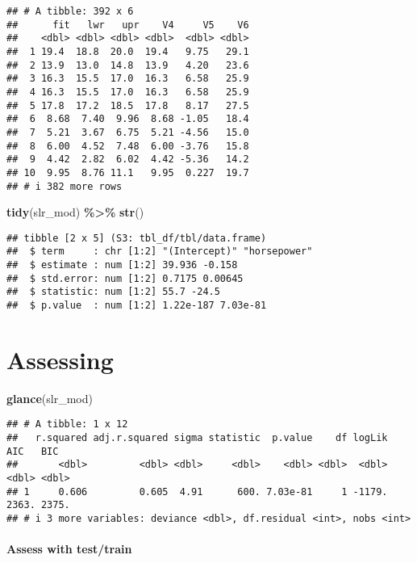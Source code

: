 \documentclass[
]{article}
\newenvironment{Shaded}{\begin{snugshade}}{\end{snugshade}}
\newcommand{\FunctionTok}[1]{\textcolor[rgb]{0.13,0.29,0.53}{\textbf{#1}}}
\newcommand{\NormalTok}[1]{#1}
\newcommand{\SpecialCharTok}[1]{\textcolor[rgb]{0.81,0.36,0.00}{\textbf{#1}}}
\begin{document}
\begin{verbatim}
## # A tibble: 392 x 6
##      fit   lwr   upr    V4     V5    V6
##    <dbl> <dbl> <dbl> <dbl>  <dbl> <dbl>
##  1 19.4  18.8  20.0  19.4   9.75   29.1
##  2 13.9  13.0  14.8  13.9   4.20   23.6
##  3 16.3  15.5  17.0  16.3   6.58   25.9
##  4 16.3  15.5  17.0  16.3   6.58   25.9
##  5 17.8  17.2  18.5  17.8   8.17   27.5
##  6  8.68  7.40  9.96  8.68 -1.05   18.4
##  7  5.21  3.67  6.75  5.21 -4.56   15.0
##  8  6.00  4.52  7.48  6.00 -3.76   15.8
##  9  4.42  2.82  6.02  4.42 -5.36   14.2
## 10  9.95  8.76 11.1   9.95  0.227  19.7
## # i 382 more rows
\end{verbatim}

\begin{Shaded}
\begin{Highlighting}[]
\FunctionTok{tidy}\NormalTok{(slr\_mod) }\SpecialCharTok{\%\textgreater{}\%} \FunctionTok{str}\NormalTok{()}
\end{Highlighting}
\end{Shaded}

\begin{verbatim}
## tibble [2 x 5] (S3: tbl_df/tbl/data.frame)
##  $ term     : chr [1:2] "(Intercept)" "horsepower"
##  $ estimate : num [1:2] 39.936 -0.158
##  $ std.error: num [1:2] 0.7175 0.00645
##  $ statistic: num [1:2] 55.7 -24.5
##  $ p.value  : num [1:2] 1.22e-187 7.03e-81
\end{verbatim}

\section{Assessing}\label{assessing}

\begin{Shaded}
\begin{Highlighting}[]
\FunctionTok{glance}\NormalTok{(slr\_mod)}
\end{Highlighting}
\end{Shaded}

\begin{verbatim}
## # A tibble: 1 x 12
##   r.squared adj.r.squared sigma statistic  p.value    df logLik   AIC   BIC
##       <dbl>         <dbl> <dbl>     <dbl>    <dbl> <dbl>  <dbl> <dbl> <dbl>
## 1     0.606         0.605  4.91      600. 7.03e-81     1 -1179. 2363. 2375.
## # i 3 more variables: deviance <dbl>, df.residual <int>, nobs <int>
\end{verbatim}

\paragraph{Assess with test/train}\label{assess-with-testtrain}
\end{document}
